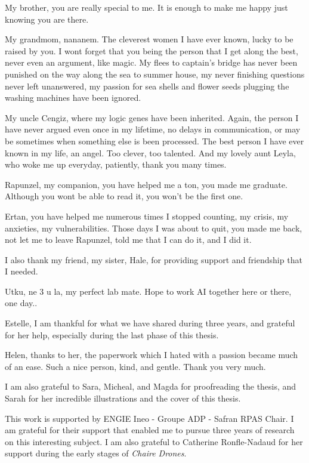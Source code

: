 My brother, you are really special to me. It is enough to make me happy just knowing you are there.

My grandmom, nananem. The cleverest women I have ever known, lucky to be raised by you. I wont forget that you being the person that I get along the best, never even an argument, like magic. My flees to captain's bridge has never been punished on the way along the sea to summer house, my never finishing questions never left unanswered, my passion for sea shells and flower seeds plugging the washing machines have been ignored. 

My uncle Cengiz, where my logic genes have been inherited. Again, the person I have never argued even once in my lifetime, no delays in communication, or may be sometimes when something else is been processed. The best person I have ever known in my life, an angel. Too clever, too talented. And my lovely aunt Leyla, who woke me up everyday, patiently, thank you many times.

Rapunzel, my companion, you have helped me a ton, you made me graduate. Although you wont be able to read it, you won't be the first one. 

Ertan, you have helped me numerous times I stopped counting, my crisis, my anxieties, my vulnerabilities. Those days I was about to quit, you made me back, not let me to leave Rapunzel, told me that I can do it, and I did it.

I also thank my friend, my sister, Hale, for providing support and friendship that I needed. 

Utku, ne 3 u la, my perfect lab mate. Hope to work AI together here or there, one day.. 

Estelle, I am thankful for what we have shared during three years, and grateful for her help, especially during the last phase of this thesis.

Helen, thanks to her, the paperwork which I hated with a passion became much of an ease. Such a nice person, kind, and gentle. Thank you very much.

I am also grateful to Sara, Micheal, and Magda for proofreading the thesis, and Sarah for her incredible illustrations and the cover of this thesis. 

This work is supported by ENGIE Ineo - Groupe ADP - Safran RPAS Chair. I am grateful for their support that enabled me to pursue three years of research on this interesting subject. I am also grateful to Catherine Ronfle-Nadaud for her support during the early stages of \emph{Chaire Drones}.

